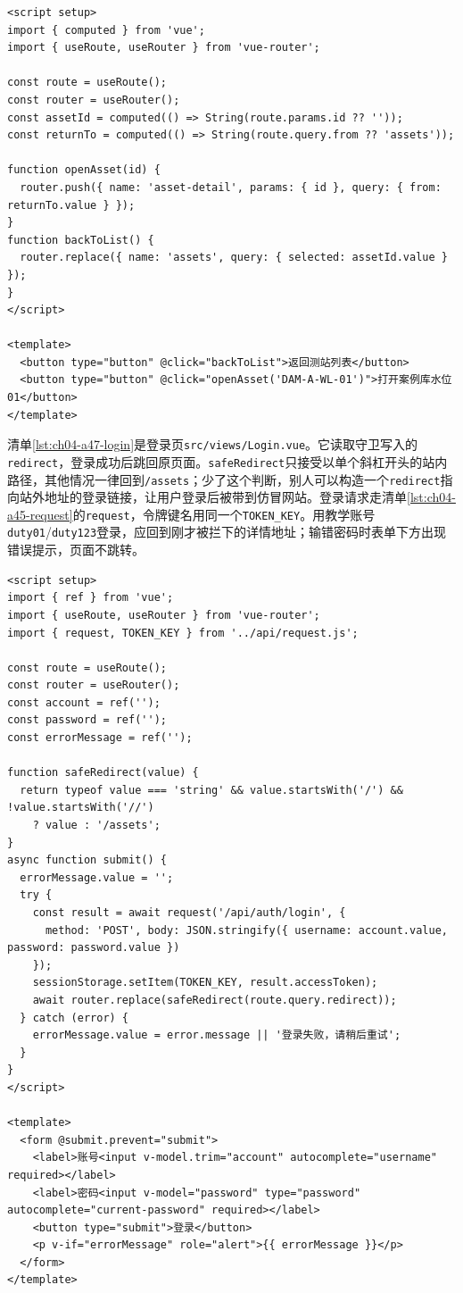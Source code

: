 \begin{lstlisting}[label={lst:ch04-a47-navigation},language=Vue,caption={useRouter、useRoute 与编程式导航}]
<script setup>
import { computed } from 'vue';
import { useRoute, useRouter } from 'vue-router';

const route = useRoute();
const router = useRouter();
const assetId = computed(() => String(route.params.id ?? ''));
const returnTo = computed(() => String(route.query.from ?? 'assets'));

function openAsset(id) {
  router.push({ name: 'asset-detail', params: { id }, query: { from: returnTo.value } });
}
function backToList() {
  router.replace({ name: 'assets', query: { selected: assetId.value } });
}
</script>

<template>
  <button type="button" @click="backToList">返回测站列表</button>
  <button type="button" @click="openAsset('DAM-A-WL-01')">打开案例库水位01</button>
</template>
\end{lstlisting}

清单\ref{lst:ch04-a47-login}是登录页\texttt{src/views/Login.vue}。它读取守卫写入的\texttt{redirect}，登录成功后跳回原页面。\texttt{safeRedirect}只接受以单个斜杠开头的站内路径，其他情况一律回到\texttt{/assets}；少了这个判断，别人可以构造一个\texttt{redirect}指向站外地址的登录链接，让用户登录后被带到仿冒网站。登录请求走清单\ref{lst:ch04-a45-request}的\texttt{request}，令牌键名用同一个\texttt{TOKEN\_KEY}。用教学账号\texttt{duty01}/\texttt{duty123}登录，应回到刚才被拦下的详情地址；输错密码时表单下方出现错误提示，页面不跳转。

\begin{lstlisting}[label={lst:ch04-a47-login},language=Vue,caption={登录成功后的安全回跳}]
<script setup>
import { ref } from 'vue';
import { useRoute, useRouter } from 'vue-router';
import { request, TOKEN_KEY } from '../api/request.js';

const route = useRoute();
const router = useRouter();
const account = ref('');
const password = ref('');
const errorMessage = ref('');

function safeRedirect(value) {
  return typeof value === 'string' && value.startsWith('/') && !value.startsWith('//')
    ? value : '/assets';
}
async function submit() {
  errorMessage.value = '';
  try {
    const result = await request('/api/auth/login', {
      method: 'POST', body: JSON.stringify({ username: account.value, password: password.value })
    });
    sessionStorage.setItem(TOKEN_KEY, result.accessToken);
    await router.replace(safeRedirect(route.query.redirect));
  } catch (error) {
    errorMessage.value = error.message || '登录失败，请稍后重试';
  }
}
</script>

<template>
  <form @submit.prevent="submit">
    <label>账号<input v-model.trim="account" autocomplete="username" required></label>
    <label>密码<input v-model="password" type="password" autocomplete="current-password" required></label>
    <button type="submit">登录</button>
    <p v-if="errorMessage" role="alert">{{ errorMessage }}</p>
  </form>
</template>
\end{lstlisting}

